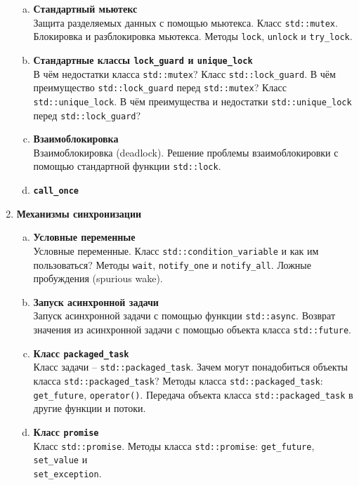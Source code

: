 \documentclass{article}
\begin{document}
\begin{enumerate}
\begin{enumerate}[a.]
\item \textbf{Стандартный мьютекс}\\
Защита разделяемых данных с помощью мьютекса. Класс \texttt{std::mutex}. Блокировка и разблокировка мьютекса. Методы \texttt{lock}, \texttt{unlock} и \texttt{try\_lock}.

\item \textbf{Стандартные классы \texttt{lock\_guard} и \texttt{unique\_lock}}\\
В чём недостатки класса \texttt{std::mutex}? Класс \texttt{std::lock\_guard}.  
В чём преимущество \texttt{std::lock\_guard} перед \texttt{std::mutex}? Класс \texttt{std::unique\_lock}. В чём преимущества и недостатки \texttt{std::unique\_lock} перед \texttt{std::lock\_guard}? 

\item \textbf{Взаимоблокировка}\\
Взаимоблокировка (deadlock). Решение проблемы взаимоблокировки с помощью стандартной функции \texttt{std::lock}.

\item \textbf{\texttt{call\_once}}\\
\end{enumerate}



\item \textbf{Механизмы синхронизации}
\begin{enumerate}[a.]
\item \textbf{Условные переменные}\\
Условные переменные. Класс \texttt{std::condition\_variable} и как им пользоваться? Методы \texttt{wait}, \texttt{notify\_one} и \texttt{notify\_all}. Ложные пробуждения (spurious wake).

\item \textbf{Запуск асинхронной задачи}\\
Запуск асинхронной задачи с помощью функции \texttt{std::async}. Возврат значения из асинхронной задачи с помощью объекта класса \texttt{std::future}.

\item \textbf{Класс \texttt{packaged\_task}}\\
Класс задачи -- \texttt{std::packaged\_task}. Зачем могут понадобиться объекты класса \texttt{std::packaged\_task}? Методы класса \texttt{std::packaged\_task}: \texttt{get\_future}, \texttt{operator()}. Передача объекта класса \texttt{std::packaged\_task} в другие функции и потоки.


\item \textbf{Класс \texttt{promise}}\\
Класс \texttt{std::promise}. Методы класса \texttt{std::promise}: \texttt{get\_future}, \texttt{set\_value} и\\ \texttt{set\_exception}.
\end{enumerate}



\end{enumerate}
\end{document}

